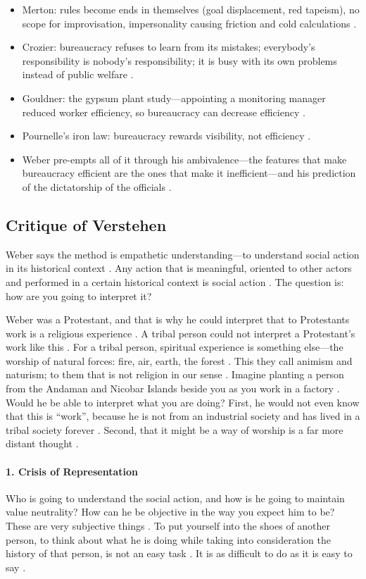 \begin{QuickRevision}
\begin{itemize}
    \item Merton: rules become ends in themselves (goal displacement, red tapeism), no scope for improvisation, impersonality causing friction and cold calculations .
    \item Crozier: bureaucracy refuses to learn from its mistakes; everybody's responsibility is nobody's responsibility; it is busy with its own problems instead of public welfare .
    \item Gouldner: the gypsum plant study---appointing a monitoring manager reduced worker efficiency, so bureaucracy can decrease efficiency .
    \item Pournelle's iron law: bureaucracy rewards visibility, not efficiency .
    \item Weber pre-empts all of it through his ambivalence---the features that make bureaucracy efficient are the ones that make it inefficient---and his prediction of the dictatorship of the officials .
\end{itemize}
\end{QuickRevision}

\subsection{Critique of Verstehen}
Weber says the method is empathetic understanding---to understand social action in its historical context . Any action that is meaningful, oriented to other actors and performed in a certain historical context is social action . The question is: how are you going to interpret it? 

Weber was a Protestant, and that is why he could interpret that to Protestants work is a religious experience .
A tribal person could not interpret a Protestant's work like this . For a tribal person, spiritual experience is something else---the worship of natural forces: fire, air, earth, the forest . This they call animism and naturism; to them that is not religion in our sense .
Imagine planting a person from the Andaman and Nicobar Islands beside you as you work in a factory . Would he be able to interpret what you are doing? First, he would not even know that this is ``work'', because he is not from an industrial society and has lived in a tribal society forever . Second, that it might be a way of worship is a far more distant thought .

\paragraph{1. Crisis of Representation}
Who is going to understand the social action, and how is he going to maintain value neutrality?  How can he be objective in the way you expect him to be? These are very subjective things .
To put yourself into the shoes of another person, to think about what he is doing while taking into consideration the history of that person, is not an easy task . It is as difficult to do as it is easy to say .

